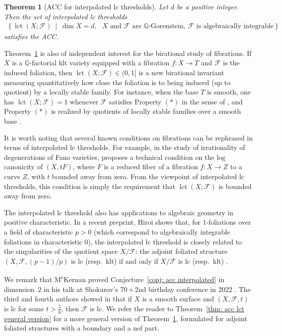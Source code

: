 \documentclass[11pt,reqno]{amsart}
\numberwithin{equation}{section}
\newcommand{\lct}{\operatorname{lct}}
\newcommand{\Ff}{\mathcal{F}}
\newtheorem{alphthm}{Theorem}
\theoremstyle{definition}
\begin{document}
\begin{alphthm}[ACC for interpolated lc thresholds]\label{thm: main ACC}
Let $d$ be a positive integer. Then the set of interpolated lc thresholds 
\begin{align*}
    \left \{
\lct(X;\Ff)
\ \middle \vert \ 
\dim X=d, 
\text{ $X$ and $\Ff$ are $\mathbb Q$-Gorenstein, $\Ff$ is algebraically integrable} 
    \right \}
\end{align*}
satisfies the ACC.
\end{alphthm}

Theorem~\ref{thm: main ACC} is also of independent interest for the birational study of fibrations. If $X$ is a $\mathbb Q$-factorial klt variety equipped with a fibration $f\colon X\to T$ and $\Ff$ is the induced foliation, then $\lct(X;\Ff)\in (0,1]$ is a new birational invariant measuring quantitatively how close the foliation is to being induced (up to quotient) by a locally stable family. For instance, when the base $T$ is smooth, one has $\lct(X;\Ff)=1$ whenever $\Ff$ satisfies Property $(*)$ in the sense of \cite[Definition~3.5]{ACSS21}, and Property $(*)$ is realized by quotients of locally stable families over a smooth base \cite[Proposition~3.5]{FS25}. 

It is worth noting that several known conditions on fibrations can be rephrased in terms of interpolated lc thresholds. For example, in the study of irrationality of degenerations of Fano varieties, \cite[Theorem~1.3(3)]{BQ24} proposes a technical condition on the log canonicity of $(X,tF)$, where $F$ is a reduced fiber of a fibration $f\colon X\to Z$ to a curve $Z$, with $t$ bounded away from zero. From the viewpoint of interpolated lc thresholds, this condition is simply the requirement that $\lct(X;\Ff)$ is bounded away from zero.

The interpolated lc threshold also has applications to algebraic geometry in positive characteristic. In a recent preprint, Hiroi shows that, for $1$-foliations over a field of characteristic $p>0$ (which correspond to algebraically integrable foliations in characteristic $0$), the interpolated lc threshold is closely related to the singularities of the quotient space $X/\Ff$: the adjoint foliated structure $(X,\Ff,(p-1)/p)$ is lc (resp.\ klt) if and only if $X/\Ff$ is lc (resp.\ klt) \cite[Theorem~3.2.5]{Hir26}.

We remark that M\textsuperscript{c}Kernan proved Conjecture~\ref{conj: acc interpolated} in dimension~$2$ in his talk at Shokurov's 70\,$+$\,2nd birthday conference in 2022 \cite{McK22}. The third and fourth authors showed in \cite[Lemma~2.19]{SS23} that if $X$ is a smooth surface and $(X,\Ff,t)$ is lc for some $t>\frac{5}{6}$, then $\Ff$ is lc. We refer the reader to Theorem~\ref{thm: acc lct general version} for a more general version of Theorem~\ref{thm: main ACC}, formulated for adjoint foliated structures with a boundary and a nef part.
\end{document}
